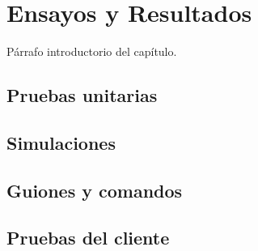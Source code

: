 
\chapter{Ensayos y Resultados} %

\label{Chapter4} %


Párrafo introductorio del capítulo.

\section{Pruebas unitarias}

\section{Simulaciones}

\section{Guiones y comandos}

\section{Pruebas del cliente}

